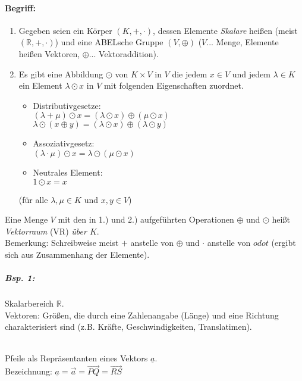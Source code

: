 \paragraph{Begriff:}
\begin{enumerate}
\item Gegeben seien ein Körper $(K,+,\cdot)$, dessen Elemente \emph{Skalare} heißen (meist $(\mathbb{R}, + ,\cdot)$) und eine ABELsche Gruppe $(V,\oplus)$ ($V$... Menge, Elemente heißen Vektoren, $\oplus$... Vektoraddition).
\item Es gibt eine Abbildung $\odot$ von $K\times V$ in $V$ die jedem $x \in V$ und jedem $\lambda \in K$ ein Element $\lambda \odot x$ in $V$ mit folgenden Eigenschaften zuordnet.
\begin{itemize}
\item Distributivgesetze: \\
$(\lambda + \mu)\odot x = (\lambda \odot x) \oplus (\mu \odot x)$\\
$\lambda\odot(x\oplus y)=(\lambda \odot x) \oplus (\lambda \odot y)$
\item Assoziativgesetz:\\
$(\lambda \cdot \mu ) \odot x = \lambda \odot (\mu \odot x)$
\item Neutrales Element:\\
$1 \odot x = x $
\end{itemize}
(für alle $\lambda, \mu \in K$ und $x,y\in V$)
\end{enumerate}
Eine Menge $V$ mit den in 1.) und 2.) aufgeführten Operationen $\oplus$ und $\odot$ heißt \emph{Vektorraum} (VR) \emph{über $K$}.\\
Bemerkung: Schreibweise meist $+$ anstelle von $\oplus$ und $\cdot$ anstelle von $odot$ (ergibt sich aus Zusammenhang der Elemente).
\subparagraph{Bsp. 1:} \parskp
Skalarbereich $\mathbb{R}$.\\
Vektoren: Größen, die durch eine Zahlenangabe (Länge) und eine Richtung charakterisiert sind (z.B. Kräfte, Geschwindigkeiten, Translatimen).\\
\\
Pfeile als Repräsentanten eines Vektors $\underline{a}$.\\
Bezeichnung: $\underline{a}=\overrightarrow{a}=\overrightarrow{PQ}=\overrightarrow{RS}$

